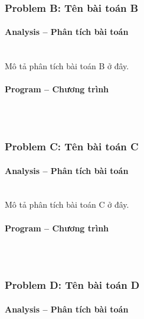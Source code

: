 \subsubsection{Problem B: Tên bài toán B}

\paragraph{Analysis -- Phân tích bài toán} \mbox{} \\

Mô tả phân tích bài toán B ở đây.

\paragraph{Program -- Chương trình} \mbox{} \\

\begin{lstlisting}

\end{lstlisting}

\subsubsection{Problem C: Tên bài toán C}

\paragraph{Analysis -- Phân tích bài toán} \mbox{} \\

Mô tả phân tích bài toán C ở đây.

\paragraph{Program -- Chương trình} \mbox{} \\

\begin{lstlisting}

\end{lstlisting}

\subsubsection{Problem D: Tên bài toán D}

\paragraph{Analysis -- Phân tích bài toán} \mbox{} \\

